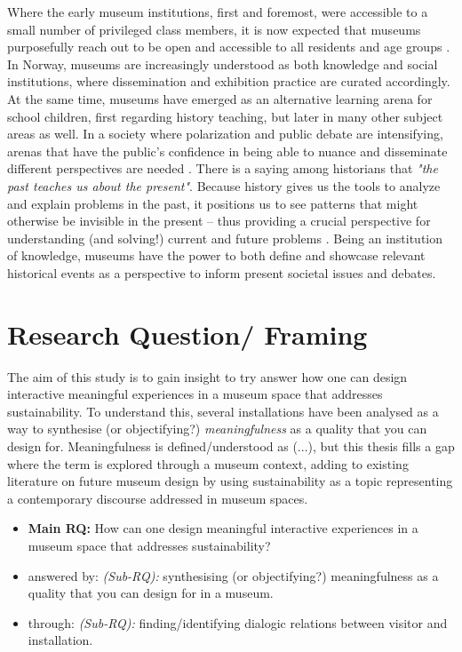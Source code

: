 Where the early museum institutions, first and foremost, were accessible to a small number of privileged class members, it is now expected that museums purposefully reach out to be open and accessible to all residents and age groups \autocite[p. 14]{melding23}. In Norway, museums are increasingly understood as both knowledge and social institutions, where dissemination and exhibition practice are curated accordingly. At the same time, museums have emerged as an alternative learning arena for school children, first regarding history teaching, but later in many other subject areas as well. In a society where polarization and public debate are intensifying, arenas that have the public's confidence in being able to nuance and disseminate different perspectives are needed \autocite[p. 7]{melding23}. There is a saying among historians that \emph{"the past teaches us about the present"}. Because history gives us the tools to analyze and explain problems in the past, it positions us to see patterns that might otherwise be invisible in the present – thus providing a crucial perspective for understanding (and solving!) current and future problems \autocite{UW_website}. Being an institution of knowledge, museums have the power to both define and showcase relevant historical events as a perspective to inform present societal issues and debates. 



\section{Research Question/ Framing}
The aim of this study is to gain insight to try answer how one can design interactive meaningful experiences in a museum space that addresses sustainability. To understand this, several installations have been analysed as a way to synthesise (or objectifying?) \emph{meaningfulness} as a quality that you can design for. Meaningfulness is defined/understood as (...), but this thesis fills a gap where the term is explored through a museum context, adding to existing literature on future museum design by using sustainability as a topic representing a contemporary discourse addressed in museum spaces.

\begin{itemize}
    \item \textbf{Main RQ:} How can one design meaningful interactive experiences in a museum space that addresses sustainability?
    \item answered by: \emph{(Sub-RQ):} synthesising (or objectifying?) meaningfulness as a quality that you can design for in a museum.
    \item through: \emph{(Sub-RQ):} finding/identifying dialogic relations between visitor and installation.
\end{itemize}


